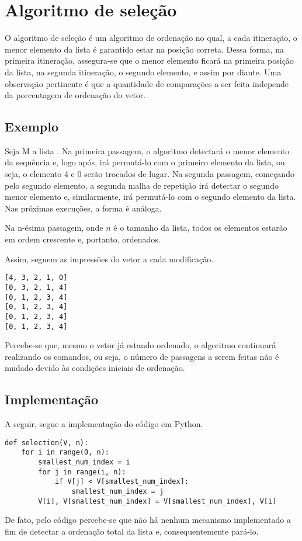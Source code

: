 \section{Algoritmo de seleção}
O algoritmo de seleção é um algoritmo de ordenação no qual, a cada itineração, o menor elemento da lista é garantido estar na posição correta. Dessa forma, na primeira itineração, assegura-se que o menor elemento ficará na primeira posição da lista, na segunda itineração, o segundo elemento, e assim por diante. 
Uma observação pertinente é que a quantidade de comparações a ser feita independe da porcentagem de ordenação do vetor.

\subsection{Exemplo}
Seja M a lista \code{[4,3,2,1,0]}. Na primeira passagem, o algoritmo detectará o menor elemento da sequência e, logo após, irá permutá-lo com o primeiro elemento da lista, ou seja, o elemento 4 e 0 serão trocados de lugar. Na segunda passagem, começando pelo segundo elemento, a segunda malha de repetição irá detectar o segundo menor elemento e, similarmente, irá permutá-lo com o segundo elemento da lista. Nas próximas execuções, a forma é análoga.

Na n-ésima passagem, onde $n$ é o tamanho da lista, todos os elementos estarão em ordem crescente e, portanto, ordenados.

Assim, seguem as impressões do vetor a cada modificação.

\begin{lstlisting}
[4, 3, 2, 1, 0]
[0, 3, 2, 1, 4]
[0, 1, 2, 3, 4]
[0, 1, 2, 3, 4]
[0, 1, 2, 3, 4]
[0, 1, 2, 3, 4]
\end{lstlisting}

Percebe-se que, mesmo o vetor já estando ordenado, o algoritmo continuará realizando os comandos, ou seja, o número de passagens a serem feitas não é mudado devido às condições iniciais de ordenação.

\newpage
\subsection{Implementação}
A seguir, segue a implementação do código em Python.

\begin{lstlisting}
def selection(V, n):
    for i in range(0, n):
        smallest_num_index = i
        for j in range(i, n):
            if V[j] < V[smallest_num_index]:
                smallest_num_index = j
        V[i], V[smallest_num_index] = V[smallest_num_index], V[i]

\end{lstlisting}
De fato, pelo código percebe-se que não há nenhum mecanismo implementado a fim de detectar a ordenação total da lista e, consequentemente pará-lo.


